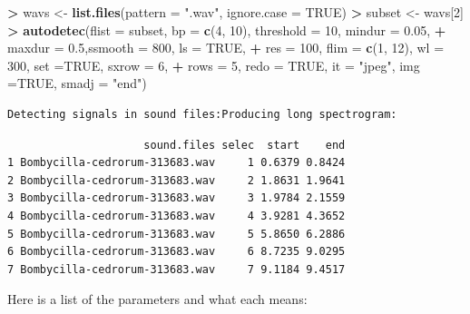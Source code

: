 \documentclass[]{krantz}
\makeatletter
\newenvironment{Shaded}{\begin{snugshade}}{\end{snugshade}}
\newcommand{\KeywordTok}[1]{\textcolor[rgb]{0.27,0.27,0.27}{\textbf{#1}}}
\newcommand{\DataTypeTok}[1]{\textcolor[rgb]{0.27,0.27,0.27}{#1}}
\newcommand{\DecValTok}[1]{\textcolor[rgb]{0.06,0.06,0.06}{#1}}
\newcommand{\FloatTok}[1]{\textcolor[rgb]{0.06,0.06,0.06}{#1}}
\newcommand{\StringTok}[1]{\textcolor[rgb]{0.5,0.5,0.5}{#1}}
\newcommand{\OtherTok}[1]{\textcolor[rgb]{0.37,0.37,0.37}{#1}}
\newcommand{\OperatorTok}[1]{\textcolor[rgb]{0.43,0.43,0.43}{\textbf{#1}}}
\newcommand{\NormalTok}[1]{#1}
\newenvironment{kframe}{%
\medskip{}
\setlength{\fboxsep}{.8em}
 \def\at@end@of@kframe{}%
 \ifinner\ifhmode%
  \def\at@end@of@kframe{\end{minipage}}%
  \begin{minipage}{\columnwidth}%
 \fi\fi%
 \def\FrameCommand##1{\hskip\@totalleftmargin \hskip-\fboxsep
 \colorbox{shadecolor}{##1}\hskip-\fboxsep
     \hskip-\linewidth \hskip-\@totalleftmargin \hskip\columnwidth}%
 \MakeFramed {\advance\hsize-\width
   \@totalleftmargin\z@ \linewidth\hsize
   \@setminipage}}%
 {\par\unskip\endMakeFramed%
 \at@end@of@kframe}
\renewenvironment{Shaded}{\begin{kframe}}{\end{kframe}}
\makeatother
\begin{document}
\begin{Shaded}
\begin{Highlighting}[]
\OperatorTok{>}\StringTok{ }\NormalTok{wavs <-}\StringTok{ }\KeywordTok{list.files}\NormalTok{(}\DataTypeTok{pattern =} \StringTok{".wav"}\NormalTok{, }\DataTypeTok{ignore.case =} \OtherTok{TRUE}\NormalTok{)}
\OperatorTok{>}\StringTok{ }\NormalTok{subset <-}\StringTok{ }\NormalTok{wavs[}\DecValTok{2}\NormalTok{]}
\OperatorTok{>}\StringTok{ }\KeywordTok{autodetec}\NormalTok{(}\DataTypeTok{flist =}\NormalTok{ subset, }\DataTypeTok{bp =} \KeywordTok{c}\NormalTok{(}\DecValTok{4}\NormalTok{, }\DecValTok{10}\NormalTok{), }\DataTypeTok{threshold =} \DecValTok{10}\NormalTok{, }\DataTypeTok{mindur =} \FloatTok{0.05}\NormalTok{, }
\OperatorTok{+}\StringTok{           }\DataTypeTok{maxdur =} \FloatTok{0.5}\NormalTok{,}\DataTypeTok{ssmooth =} \DecValTok{800}\NormalTok{, }\DataTypeTok{ls =} \OtherTok{TRUE}\NormalTok{, }
\OperatorTok{+}\StringTok{           }\DataTypeTok{res =} \DecValTok{100}\NormalTok{, }\DataTypeTok{flim =} \KeywordTok{c}\NormalTok{(}\DecValTok{1}\NormalTok{, }\DecValTok{12}\NormalTok{), }\DataTypeTok{wl =} \DecValTok{300}\NormalTok{, }\DataTypeTok{set =}\OtherTok{TRUE}\NormalTok{, }\DataTypeTok{sxrow =} \DecValTok{6}\NormalTok{, }
\OperatorTok{+}\StringTok{           }\DataTypeTok{rows =} \DecValTok{5}\NormalTok{, }\DataTypeTok{redo =} \OtherTok{TRUE}\NormalTok{, }\DataTypeTok{it =} \StringTok{"jpeg"}\NormalTok{, }\DataTypeTok{img =}\OtherTok{TRUE}\NormalTok{, }\DataTypeTok{smadj =} \StringTok{"end"}\NormalTok{)}
\end{Highlighting}
\end{Shaded}

\begin{verbatim}
Detecting signals in sound files:Producing long spectrogram:
\end{verbatim}

\begin{verbatim}
                     sound.files selec  start    end
1 Bombycilla-cedrorum-313683.wav     1 0.6379 0.8424
2 Bombycilla-cedrorum-313683.wav     2 1.8631 1.9641
3 Bombycilla-cedrorum-313683.wav     3 1.9784 2.1559
4 Bombycilla-cedrorum-313683.wav     4 3.9281 4.3652
5 Bombycilla-cedrorum-313683.wav     5 5.8650 6.2886
6 Bombycilla-cedrorum-313683.wav     6 8.7235 9.0295
7 Bombycilla-cedrorum-313683.wav     7 9.1184 9.4517
\end{verbatim}

Here is a list of the parameters and what each means:
\end{document}

